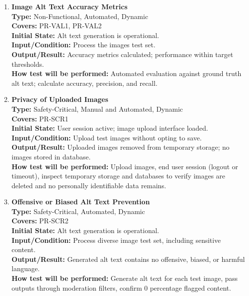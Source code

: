 \documentclass[12pt, titlepage]{article}
\begin{document}
\begin{enumerate}[label=NFR-ST \arabic*., wide=0pt, leftmargin=*]
  \item \textbf{Image Alt Text Accuracy Metrics} \\[2mm]
    \textbf{Type:} Non-Functional, Automated, Dynamic \\
    \textbf{Covers:} PR-VAL1, PR-VAL2 \\
    \textbf{Initial State:} Alt text generation is operational. \\
    \textbf{Input/Condition:} Process the images test set. \\
    \textbf{Output/Result:} Accuracy metrics calculated; performance
    within target thresholds. \\[2mm]
    \textbf{How test will be performed:} Automated evaluation against
    ground truth alt text; calculate accuracy, precision, and recall.

  \item \textbf{Privacy of Uploaded Images} \\[2mm]
    \textbf{Type:} Safety-Critical, Manual and Automated, Dynamic \\
    \textbf{Covers:} PR-SCR1 \\
    \textbf{Initial State:} User session active; image upload
    interface loaded. \\
    \textbf{Input/Condition:} Upload test images without opting to save. \\
    \textbf{Output/Result:} Uploaded images removed from temporary
    storage; no images stored in database. \\[2mm]
    \textbf{How test will be performed:}
    Upload images, end user session (logout or timeout), inspect
    temporary storage and databases to verify images are deleted and
    no personally identifiable data remains.

  \item \textbf{Offensive or Biased Alt Text Prevention} \\[2mm]
    \textbf{Type:} Safety-Critical, Automated, Dynamic \\
    \textbf{Covers:} PR-SCR2 \\
    \textbf{Initial State:} Alt text generation is operational. \\
    \textbf{Input/Condition:} Process diverse image test set,
    including sensitive content. \\
    \textbf{Output/Result:} Generated alt text contains no offensive,
    biased, or harmful language. \\[2mm]
    \textbf{How test will be performed:}
    Generate alt text for each test image, pass outputs through
    moderation filters, confirm 0 percentage flagged content.


\end{enumerate}
\end{document}

